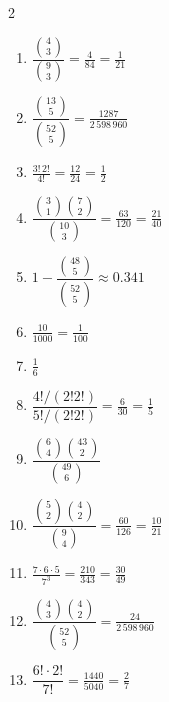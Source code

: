 \documentclass[11pt]{article}
\begin{document}
\begin{keybox}
\begin{multicols}{2}
\small
\begin{enumerate}[leftmargin=*,itemsep=3pt]
  \item $\dfrac{\binom{4}{3}}{\binom{9}{3}}=\tfrac{4}{84}=\tfrac{1}{21}$
  \item $\dfrac{\binom{13}{5}}{\binom{52}{5}}=\tfrac{1287}{2\,598\,960}$
  \item $\tfrac{3!\,2!}{4!}=\tfrac{12}{24}=\tfrac12$
  \item $\dfrac{\binom{3}{1}\binom{7}{2}}{\binom{10}{3}}=\tfrac{63}{120}=\tfrac{21}{40}$
  \item $1-\dfrac{\binom{48}{5}}{\binom{52}{5}}\approx0.341$
  \item $\tfrac{10}{1000}=\tfrac{1}{100}$
  \item $\tfrac16$
  \item $\dfrac{4!/(2!2!)}{5!/(2!2!)}=\tfrac{6}{30}=\tfrac15$
  \item $\dfrac{\binom{6}{4}\binom{43}{2}}{\binom{49}{6}}$
  \item $\dfrac{\binom{5}{2}\binom{4}{2}}{\binom{9}{4}}=\tfrac{60}{126}=\tfrac{10}{21}$
  \item $\tfrac{7\cdot6\cdot5}{7^3}=\tfrac{210}{343}=\tfrac{30}{49}$
  \item $\dfrac{\binom{4}{3}\binom{4}{2}}{\binom{52}{5}}=\tfrac{24}{2\,598\,960}$
  \item $\dfrac{6!\cdot2!}{7!}=\tfrac{1440}{5040}=\tfrac27$
\end{enumerate}
\end{multicols}
\end{keybox}
\end{document}
